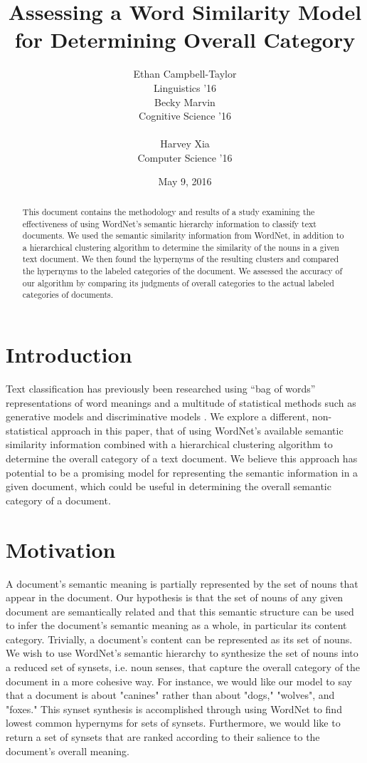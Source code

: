 \documentclass[12pt]{article}
\title{Assessing a Word Similarity Model for Determining Overall Category}
\author{Ethan Campbell-Taylor \\
Linguistics '16\\\And
  Becky Marvin \\
  Cognitive Science '16 \\
  \\\And
  Harvey Xia \\
  Computer Science '16 \\}
\date{May 9, 2016}
\begin{document}
\maketitle
\begin{abstract}
  This document contains the methodology and results of a study examining the effectiveness of using WordNet's \cite{wordnet} semantic hierarchy information to classify text documents. We used the semantic similarity information from WordNet, in addition to a hierarchical clustering algorithm to determine the similarity of the nouns in a given text document. We then found the hypernyms of the resulting clusters and compared the hypernyms to the labeled categories of the document. We assessed the accuracy of our algorithm by comparing its judgments of overall categories to the actual labeled categories of documents.
\end{abstract}

\section{Introduction}

Text classification has previously been researched using ``bag of words'' representations of word meanings and a multitude of statistical methods such as generative models and discriminative models \cite{survey}. We explore a different, non-statistical approach in this paper, that of using WordNet's available semantic similarity information combined with a hierarchical clustering algorithm to determine the overall category of a text document. We believe this approach has potential to be a promising model for representing the semantic information in a given document, which could be useful in determining the overall semantic category of a document.

\section{Motivation}

A document's semantic meaning is partially represented by the set of nouns that appear in the document. Our hypothesis is that the set of nouns of any given document are semantically related and that this semantic structure can be used to infer the document's semantic meaning as a whole, in particular its content category. Trivially, a document's content can be represented as its set of nouns. We wish to use WordNet's semantic hierarchy to synthesize the set of nouns into a reduced set of synsets, i.e. noun senses, that capture the overall category of the document in a more cohesive way. For instance, we would like our model to say that a document is about "canines" rather than about "dogs," "wolves", and "foxes." This synset synthesis is accomplished through using WordNet to find lowest common hypernyms for sets of synsets. Furthermore, we would like to return a set of synsets that are ranked according to their salience to the document's overall meaning.
\end{document}
